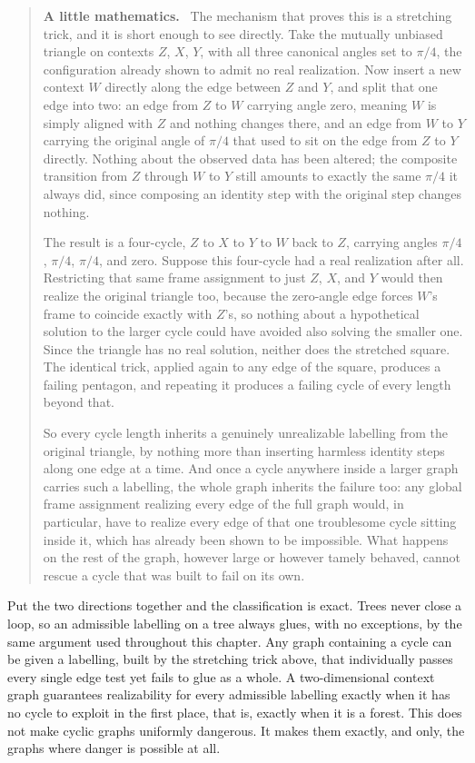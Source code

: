 \documentclass[12pt,openany]{book}
\newenvironment{lowmath}{\begin{quote}\small\noindent\textbf{A little mathematics.}\ }{\end{quote}}
\begin{document}
\begin{lowmath}
The mechanism that proves this is a stretching trick, and it is short enough to see directly. Take the mutually unbiased triangle on contexts $Z$, $X$, $Y$, with all three canonical angles set to $\pi/4$, the configuration already shown to admit no real realization. Now insert a new context $W$ directly along the edge between $Z$ and $Y$, and split that one edge into two: an edge from $Z$ to $W$ carrying angle zero, meaning $W$ is simply aligned with $Z$ and nothing changes there, and an edge from $W$ to $Y$ carrying the original angle of $\pi/4$ that used to sit on the edge from $Z$ to $Y$ directly. Nothing about the observed data has been altered; the composite transition from $Z$ through $W$ to $Y$ still amounts to exactly the same $\pi/4$ it always did, since composing an identity step with the original step changes nothing.

The result is a four-cycle, $Z$ to $X$ to $Y$ to $W$ back to $Z$, carrying angles $\pi/4$, $\pi/4$, $\pi/4$, and zero. Suppose this four-cycle had a real realization after all. Restricting that same frame assignment to just $Z$, $X$, and $Y$ would then realize the original triangle too, because the zero-angle edge forces $W$'s frame to coincide exactly with $Z$'s, so nothing about a hypothetical solution to the larger cycle could have avoided also solving the smaller one. Since the triangle has no real solution, neither does the stretched square. The identical trick, applied again to any edge of the square, produces a failing pentagon, and repeating it produces a failing cycle of every length beyond that.

So every cycle length inherits a genuinely unrealizable labelling from the original triangle, by nothing more than inserting harmless identity steps along one edge at a time. And once a cycle anywhere inside a larger graph carries such a labelling, the whole graph inherits the failure too: any global frame assignment realizing every edge of the full graph would, in particular, have to realize every edge of that one troublesome cycle sitting inside it, which has already been shown to be impossible. What happens on the rest of the graph, however large or however tamely behaved, cannot rescue a cycle that was built to fail on its own.
\end{lowmath}

Put the two directions together and the classification is exact. Trees never close a loop, so an admissible labelling on a tree always glues, with no exceptions, by the same argument used throughout this chapter. Any graph containing a cycle can be given a labelling, built by the stretching trick above, that individually passes every single edge test yet fails to glue as a whole. A two-dimensional context graph guarantees realizability for every admissible labelling exactly when it has no cycle to exploit in the first place, that is, exactly when it is a forest. This does not make cyclic graphs uniformly dangerous. It makes them exactly, and only, the graphs where danger is possible at all.
\end{document}
